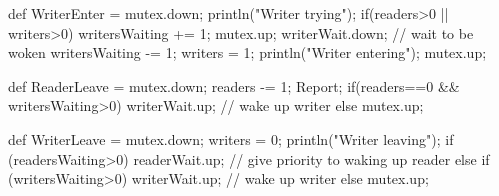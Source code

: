 \begin{answer}
\begin{scala}
{  def WriterEnter = { 
    mutex.down; println("Writer trying");
    if(readers>0 || writers>0){ 
      writersWaiting += 1; mutex.up; 
      writerWait.down; // wait to be woken
      writersWaiting -= 1; 
    }
    writers = 1; println("Writer entering"); mutex.up; 
  }

  def ReaderLeave = {
    mutex.down; 
    readers -= 1; Report; 
    if(readers==0 && writersWaiting>0) writerWait.up; // wake up writer
    else mutex.up; 
  }
      
  def WriterLeave = { 
    mutex.down;
    writers = 0; println("Writer leaving"); 
    if (readersWaiting>0) readerWait.up; // give priority to waking up reader
    else if (writersWaiting>0) writerWait.up; // wake up writer
    else mutex.up;
  }
}
\end{scala}
\end{answer}
